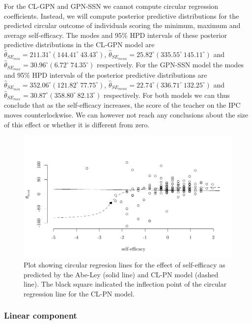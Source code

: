 \documentclass[11pt,]{article}
\begin{document}
For the CL-GPN and GPN-SSN we cannot compute circular regression
coefficients. Instead, we will compute posterior predictive
distributions for the predicted circular outcome of individuals scoring
the minimum, maximum and average self-efficacy. The modes and 95\% HPD
intervals of these posterior predictive distributions in the CL-GPN
model are
\(\hat{\theta}_{SE_{min}} = 211.31^\circ (144.41^\circ \: 43.43^\circ)\),
\(\hat{\theta}_{SE_{mean}} = 25.82^\circ (335.55^\circ \: 145.11^\circ)\)
and \(\hat{\theta}_{SE_{max}} =30.96^\circ (6.72^\circ \: 74.35^\circ)\)
respectively. For the GPN-SSN model the modes and 95\% HPD intervals of
the posterior predictive distributions are
\(\hat{\theta}_{SE_{min}} = 352.06^\circ (121.82^\circ \: 77.75^\circ)\),
\(\hat{\theta}_{SE_{mean}} = 22.74^\circ (336.71^\circ \: 132.25^\circ)\)
and
\(\hat{\theta}_{SE_{max}} = 30.87^\circ (358.80^\circ \: 82.13^\circ)\)
respectively. For both models we can thus conclude that as the
self-efficacy increases, the score of the teacher on the IPC moves
counterlockwise. We can however not reach any conclusions about the size
of this effect or whether it is different from zero.

\begin{figure}
\centering
\includegraphics[width = \textwidth]{Plots/reglinediffSE.pdf}
\caption{Plot showing circular regresion lines for the effect of self-efficacy as predicted by the Abe-Ley (solid line) and CL-PN model (dashed line). The black square indicated the inflection point of the circular regression line for the CL-PN model.}
\label{regline}
\end{figure}

\subsubsection{Linear component}
\end{document}
